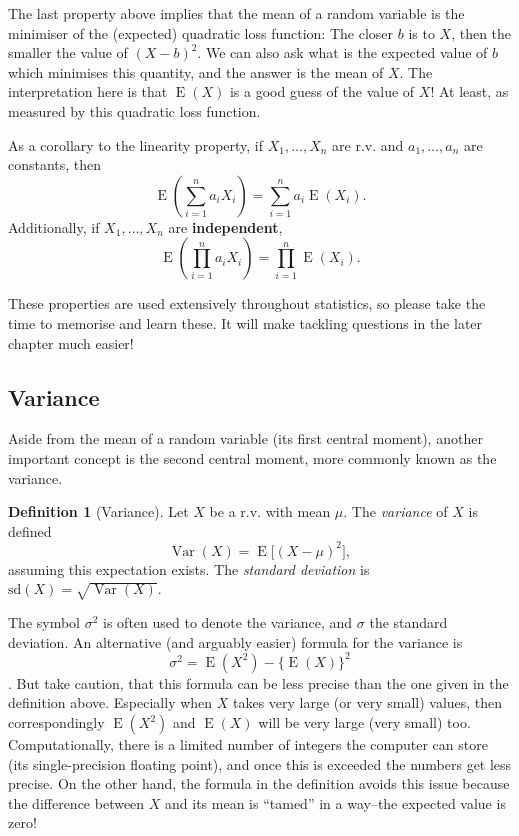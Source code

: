 \documentclass[
]{book}
\DeclareMathOperator{\E}{E}
\DeclareMathOperator{\Var}{Var}
\theoremstyle{definition}
\newtheorem{definition}{Definition}[chapter]
\theoremstyle{definition}
\theoremstyle{definition}
\theoremstyle{definition}
\theoremstyle{remark}
\begin{document}
The last property above implies that the mean of a random variable is the minimiser of the (expected) quadratic loss function:
The closer \(b\) is to \(X\), then the smaller the value of \((X-b)^2\).
We can also ask what is the expected value of \(b\) which minimises this quantity, and the answer is the mean of \(X\).
The interpretation here is that \(\E(X)\) is a good guess of the value of \(X\)! At least, as measured by this quadratic loss function.

As a corollary to the linearity property, if \(X_1,\dots,X_n\) are r.v. and \(a_1,\dots,a_n\) are constants, then
\[
\E\left(\sum_{i=1}^n a_iX_i \right) = \sum_{i=1}^n a_i\E(X_i).
\]
Additionally, if \(X_1,\dots,X_n\) are \textbf{independent},
\[
\E\left(\prod_{i=1}^n a_iX_i \right) = \prod_{i=1}^n \E(X_i).
\]

These properties are used extensively throughout statistics, so please take the time to memorise and learn these.
It will make tackling questions in the later chapter much easier!

\hypertarget{variance}{%
\subsection{Variance}\label{variance}}

Aside from the mean of a random variable (its first central moment), another important concept is the second central moment, more commonly known as the variance.

\begin{definition}[Variance]
Let \(X\) be a r.v. with mean \(\mu\). The \emph{variance} of \(X\) is defined
\[
\Var(X) = \E\big[(X-\mu)^2\big],
\]
assuming this expectation exists. The \emph{standard deviation} is \(\text{sd}(X) = \sqrt{\Var(X)}\).
\end{definition}

The symbol \(\sigma^2\) is often used to denote the variance, and \(\sigma\) the standard deviation.
An alternative (and arguably easier) formula for the variance is \[\sigma^2 = \E(X^2) - \{\E(X)\}^2\].
But take caution, that this formula can be less precise than the one given in the definition above.
Especially when \(X\) takes very large (or very small) values, then correspondingly \(\E(X^2)\) and \(\E(X)\) will be very large (very small) too.
Computationally, there is a limited number of integers the computer can store (its single-precision floating point), and once this is exceeded the numbers get less precise.
On the other hand, the formula in the definition avoids this issue because the difference between \(X\) and its mean is ``tamed'' in a way--the expected value is zero!
\end{document}
